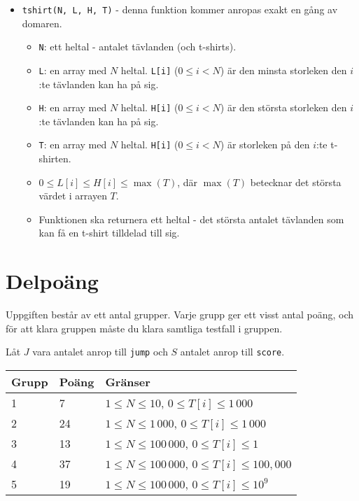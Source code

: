\begin{itemize} 
  \item \texttt{tshirt(N, L, H, T)} - denna funktion kommer anropas exakt en gång av domaren.
  \begin{itemize}
    \item \texttt{N}: ett heltal - antalet tävlanden (och t-shirts).
    \item \texttt{L}: en array med $N$ heltal. \texttt{L[i]} ($0 \le i < N$) är den minsta storleken den $i$:te tävlanden kan ha på sig.
    \item \texttt{H}: en array med $N$ heltal. \texttt{H[i]} ($0 \le i < N$) är den största storleken den $i$:te tävlanden kan ha på sig.
    \item \texttt{T}: en array med $N$ heltal. \texttt{H[i]} ($0 \le i < N$) är storleken på den $i$:te t-shirten.
    \item $0 \le L[i] \le H[i] \le \max(T)$, där $\max(T)$ betecknar det största värdet i arrayen $T$.
    \item Funktionen ska returnera ett heltal - det största antalet tävlanden som kan få en t-shirt tilldelad till sig.
  \end{itemize}
\end{itemize}



\section*{Delpoäng}
Uppgiften består av ett antal grupper. Varje grupp ger ett visst antal poäng, och för att klara
gruppen måste du klara samtliga testfall i gruppen.

Låt $J$ vara antalet anrop till \texttt{jump} och $S$ antalet anrop till \texttt{score}.

\begin{tabular}{|l|l|l|}
  \hline
  \textbf{Grupp} & \textbf{Poäng} & \textbf{Gränser} \\ \hline
  1 & 7 & $1 \le N \le 10$, $0 \le T[i] \le 1\,000$ \\ \hline
  2 & 24 & $1 \le N \le 1\,000$, $0 \le T[i] \le 1\,000$ \\ \hline
  3 & 13 & $1 \le N \le 100\,000$, $0 \le T[i] \le 1$ \\ \hline
  4 & 37 & $1 \le N \le 100\,000$, $0 \le T[i] \le 100,000$ \\ \hline
  5 & 19 & $1 \le N \le 100\,000$, $0 \le T[i] \le 10^9$ \\ \hline
\end{tabular}

